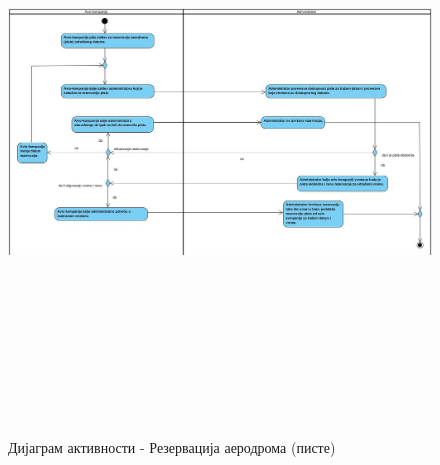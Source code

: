 \documentclass{article}
\begin{document}
\newpage
\begin{figure}[H]
    \centering
    \includegraphics[width=1.1\textwidth, height=16cm]{Dijagrami_slike/rezervacija_aerodroma.jpg}
    \caption{Дијаграм активности - Резервација аеродрома (писте)}
\end{figure}
\end{document}
